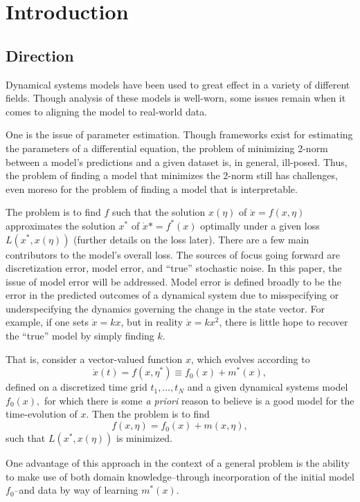 \documentclass[12pt]{article}
\begin{document}
\section{Introduction}

\subsection{Direction}

Dynamical systems models have been used to great effect in a variety of different fields. Though analysis of these models is well-worn, some issues remain when it comes to aligning the model to real-world data.

One is the issue of parameter estimation. Though frameworks exist for estimating the parameters of a differential equation, the problem of minimizing 2-norm between a model's predictions and a given dataset is, in general, ill-posed\cite{chung}. Thus, the problem of finding a model that minimizes the 2-norm still has challenges, even moreso for the problem of finding a model that is interpretable.

The problem is to find $f$ such that the solution $x(\eta)$ of $\dot{x} = f(x,\eta)$ approximates the solution $x^*$ of $\dot{x}* = f^*(x)$ optimally under a given loss $L(x^*, x(\eta))$ (further details on the loss later). There are a few main contributors to the model's overall loss. The sources of focus going forward are discretization error, model error, and ``true'' stochastic noise. In this paper, the issue of model error will be addressed. Model error is defined broadly to be the error in the predicted outcomes of a dynamical system due to misspecifying or underspecifying the dynamics governing the change in the state vector. For example, if one sets $\dot{x} = k x$, but in reality $\dot{x} = k x^2$, there is little hope to recover the ``true'' model by simply finding $k$.

That is, consider a vector-valued function $x$, which evolves according to $$\dot{x}(t) = f(x, \eta^*) \equiv f_0(x) + m^*(x),$$ defined on a discretized time grid $t_1, \ldots, t_N$ and a given dynamical systems model $f_0(x),$ for which there is some \textit{a priori} reason to believe is a good model for the time-evolution of $x$. Then the problem is to find $$f(x, \eta) = f_0(x) + m(x, \eta),$$ such that $L(x^*, x(\eta))$ is minimized.

One advantage of this approach in the context of a general problem is the ability to make use of both domain knowledge\---through incorporation of the initial model $f_0$\---and data by way of learning $m^*(x)$\cite{levine}.
\end{document}
